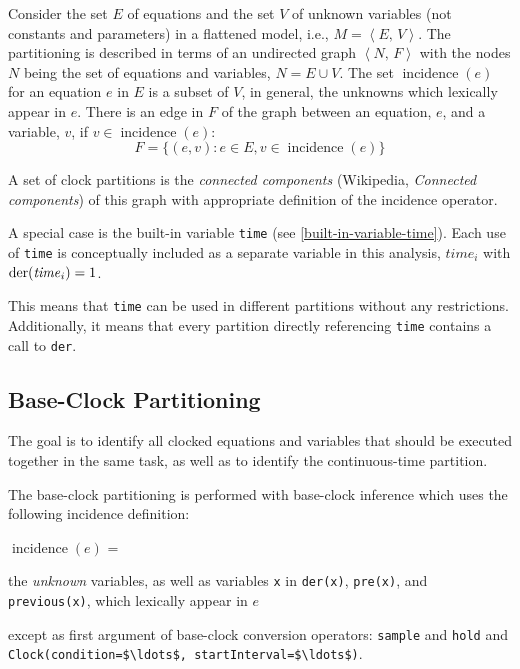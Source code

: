 Consider the set $E$ of equations and the set $V$ of unknown variables (not constants and parameters) in a flattened model, i.e., $M = \left\langle E,\, V \right\rangle$.
The partitioning is described in terms of an undirected graph $\left\langle N,\, F \right\rangle$ with the nodes $N$ being the set of equations and variables, $N = E \cup V$.
The set $\operatorname{incidence}(e)$ for an equation $e$ in $E$ is a subset of $V$, in general, the unknowns which lexically appear in $e$.
There is an edge in $F$ of the graph between an equation, $e$, and a variable, $v$, if $v \in \operatorname{incidence}(e)$:
\begin{equation*}
F = \{(e, v) : e \in E, v \in \operatorname{incidence}(e)\}
\end{equation*}

A set of clock partitions is the \emph{connected components} (Wikipedia,
\emph{Connected components}) of this graph with appropriate definition of
the incidence operator.

A special case is the built-in variable \lstinline!time! (see \cref{built-in-variable-time}).
Each use of \lstinline!time! is conceptually included as a separate variable in this analysis, $\mathit{time}_i$ with $\text{\lstinline!der!}(\mathit{time}_{i}) = 1$.
\begin{nonnormative}
This means that \lstinline!time! can be used in different partitions without any restrictions.
Additionally, it means that every partition directly referencing \lstinline!time! contains a call to \lstinline!der!.
\end{nonnormative}

\subsection{Base-Clock Partitioning}\label{base-clock-partitioning}

The goal is to identify all clocked equations and variables that should
be executed together in the same task, as well as to identify the
continuous-time partition.

The base-clock partitioning is performed with base-clock inference which
uses the following incidence definition:

$\operatorname{incidence}(e)$ =
\begin{list}{}{\setlength{\leftmargin}{2em}\setlength{\topsep}{-\parskip}}
\item
the \emph{unknown} variables, as well as variables \lstinline!x! in \lstinline!der(x)!, \lstinline!pre(x)!, and \lstinline!previous(x)!, which lexically appear in $e$
\begin{list}{}{\setlength{\leftmargin}{2em}\setlength{\topsep}{-\parskip}}
\item
except as first argument of base-clock conversion operators: \lstinline!sample! and \lstinline!hold! and \lstinline!Clock(condition=$\ldots$, startInterval=$\ldots$)!.
\end{list}
\end{list}\vspace{\parskip}%

